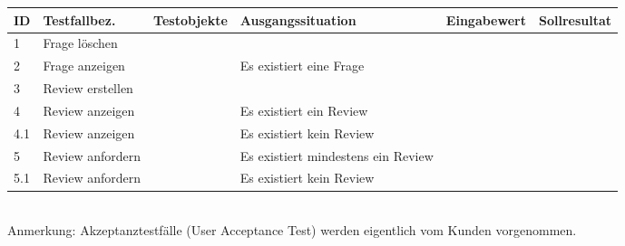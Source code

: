 \documentclass[a4paper]{scrreprt}
\begin{document}
\begin{tabular}{|p{0.5cm}|p{2cm}|p{2.5cm}|p{3cm}|p{2cm}|p{2cm}|}\hline
ID & Testfallbez.&Testobjekte&Ausgangssituation&Eingabewert&Sollresultat \\\hline
1 & Frage löschen &&&&\\\hline
2 & Frage anzeigen &&Es existiert eine Frage&&\\\hline
3 & Review erstellen &&&&\\\hline
4 & Review anzeigen &&Es existiert ein Review&&\\\hline
4.1 & Review anzeigen &&Es existiert kein Review	&&\\\hline
5 & Review anfordern &&Es existiert mindestens ein Review&&\\\hline
5.1 & Review anfordern &&Es existiert kein Review&&\\\hline
\end{tabular}\\
Anmerkung: Akzeptanztestfälle (User Acceptance Test) werden eigentlich vom Kunden vorgenommen.
 
 
\end{document}
